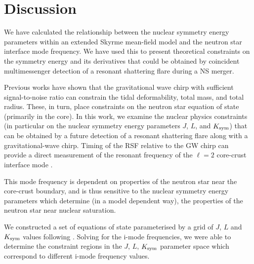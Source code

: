 \documentclass[fleqn,usenatbib]{mnras}
\begin{document}
\section{Discussion}
\hspace{\parindent}We have calculated the relationship between the nuclear symmetry energy parameters within an extended Skyrme mean-field model and the neutron star interface mode frequency. We have used this to present theoretical constraints on the symmetry energy and its derivatives that could be obtained by coincident multimessenger detection of a resonant shattering flare during a NS merger. 

 Previous works have shown \citep{abbott2017gw170817,de2018tidal,abbott2018gw170817} that the gravitational wave chirp with sufficient signal-to-noise ratio can constrain the tidal deformability, total mass, and total radius. These, in turn, place constraints on the neutron star equation of state \citep{annala2018gravitational,lim2018neutron} (primarily in the core). In this work, we examine the nuclear physics constraints (in particular on the nuclear symmetry energy parameters $J$, $L$, and $K_{\rm sym}$) that can be obtained by a future detection of a resonant shattering flare along with a gravitational-wave chirp. Timing of the RSF relative to the GW chirp can provide a direct measurement of the resonant frequency of the $\ell = 2$ core-crust interface mode  \citep{tsang2012resonant}. 
    
This mode frequency is dependent on properties of the neutron star near the core-crust boundary, and is thus sensitive to the nuclear symmetry energy parameters which determine (in a model dependent way), the properties of the neutron star near nuclear saturation. 




We constructed a set of equations of state parameterised by a grid of $J$, $L$ and $K_{\rm sym}$ values following \citet{newton2020nuclear}. Solving for the i-mode frequencies, we were able to determine the constraint regions in the $J$, $L$, $K_{\rm sym}$ parameter space which correspond to different i-mode frequency values.
\end{document}

